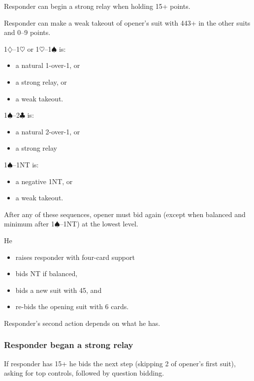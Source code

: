 \documentclass[a4paper, twoside, 11pt]{article}
\begin{document}
\begin{multicols}{3}
Responder can begin a strong relay when holding 15+ points.

Responder can make a weak takeout of opener's suit with 443+ in the other suits and 0--9 points.

 1$\diamondsuit$--1$\heartsuit$ or 1$\heartsuit$--1$\spadesuit$ is:
\begin{itemize}
\item a natural 1-over-1, or
    \item a strong relay, or
        \item a weak takeout.
\end{itemize}

1$\spadesuit$--2$\clubsuit$ is:
\begin{itemize}
\item a natural 2-over-1, or
    \item a strong relay

\end{itemize}

1$\spadesuit$--1NT is:
\begin{itemize}
\item a negative 1NT, or

        \item a weak takeout.
\end{itemize}

After any of these sequences, opener must bid again (except when balanced and minimum after 1$\spadesuit$--1NT) at the lowest level.

He
\begin{itemize}
    \item raises responder with
four-card support
\item bids NT if balanced,
\item bids a new
suit with 45, and
\item re-bids the opening suit
with 6 cards.
\end{itemize}

Responder's second action depends on what he has.

\subsubsection*{Responder began a strong relay}
If responder has 15+ he bids the next step (skipping 2 of opener's first suit), asking for top controls,
followed by question bidding.


\end{multicols}
\end{document}
